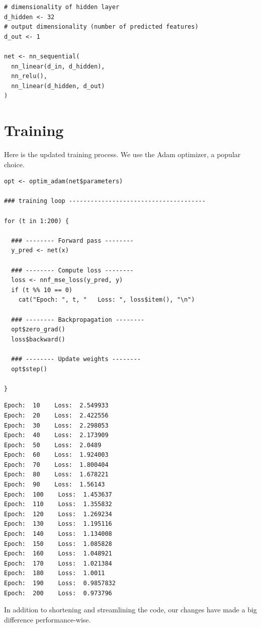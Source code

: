 \documentclass[
  letterpaper,
]{krantz}
\begin{document}
\begin{verbatim}
# dimensionality of hidden layer
d_hidden <- 32
# output dimensionality (number of predicted features)
d_out <- 1

net <- nn_sequential(
  nn_linear(d_in, d_hidden),
  nn_relu(),
  nn_linear(d_hidden, d_out)
)
\end{verbatim}

\hypertarget{training}{%
\section{Training}\label{training}}

Here is the updated training process. We use the Adam optimizer, a
popular choice.

\begin{verbatim}
opt <- optim_adam(net$parameters)

### training loop --------------------------------------

for (t in 1:200) {
  
  ### -------- Forward pass --------
  y_pred <- net(x)
  
  ### -------- Compute loss -------- 
  loss <- nnf_mse_loss(y_pred, y)
  if (t %% 10 == 0)
    cat("Epoch: ", t, "   Loss: ", loss$item(), "\n")
  
  ### -------- Backpropagation --------
  opt$zero_grad()
  loss$backward()
  
  ### -------- Update weights -------- 
  opt$step()

}
\end{verbatim}

\begin{verbatim}
Epoch:  10    Loss:  2.549933 
Epoch:  20    Loss:  2.422556 
Epoch:  30    Loss:  2.298053 
Epoch:  40    Loss:  2.173909 
Epoch:  50    Loss:  2.0489 
Epoch:  60    Loss:  1.924003 
Epoch:  70    Loss:  1.800404 
Epoch:  80    Loss:  1.678221 
Epoch:  90    Loss:  1.56143 
Epoch:  100    Loss:  1.453637 
Epoch:  110    Loss:  1.355832 
Epoch:  120    Loss:  1.269234 
Epoch:  130    Loss:  1.195116 
Epoch:  140    Loss:  1.134008 
Epoch:  150    Loss:  1.085828 
Epoch:  160    Loss:  1.048921 
Epoch:  170    Loss:  1.021384 
Epoch:  180    Loss:  1.0011 
Epoch:  190    Loss:  0.9857832 
Epoch:  200    Loss:  0.973796 
\end{verbatim}

In addition to shortening and streamlining the code, our changes have
made a big difference performance-wise.
\end{document}
